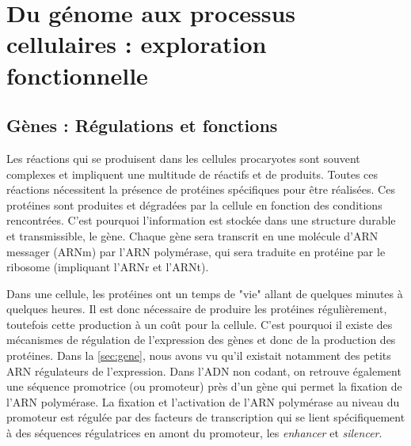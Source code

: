 \section{Du génome aux processus cellulaires : exploration fonctionnelle}

\subsection{Gènes : Régulations et fonctions}
\label{sec:fn_reg}

Les réactions qui se produisent dans les cellules procaryotes sont souvent complexes et impliquent une multitude de réactifs et de produits. Toutes ces réactions nécessitent la présence de protéines spécifiques pour être réalisées. Ces protéines sont produites et dégradées par la cellule en fonction des conditions rencontrées. C'est pourquoi l'information est stockée dans une structure durable et transmissible, le gène. Chaque gène sera transcrit en une molécule d'ARN messager (ARNm) par l'ARN polymérase, qui sera traduite en protéine par le ribosome (impliquant l'ARNr et l'ARNt). 


Dans une cellule, les protéines ont un temps de "vie" allant de quelques minutes à quelques heures. Il est donc nécessaire de produire les protéines régulièrement, toutefois cette production à un coût pour la cellule. C'est pourquoi il existe des mécanismes de régulation de l'expression des gènes et donc de la production des protéines. Dans la \autoref{sec:gene}, nous avons vu qu'il existait notamment des petits ARN régulateurs de l'expression. Dans l'ADN non codant, on retrouve également une séquence promotrice (ou promoteur) près d'un gène qui permet la fixation de l'ARN polymérase. La fixation et l'activation de l'ARN polymérase au niveau du promoteur est régulée par des facteurs de transcription qui se lient spécifiquement à des séquences régulatrices en amont du promoteur, les \textit{enhancer} et \textit{silencer}.


